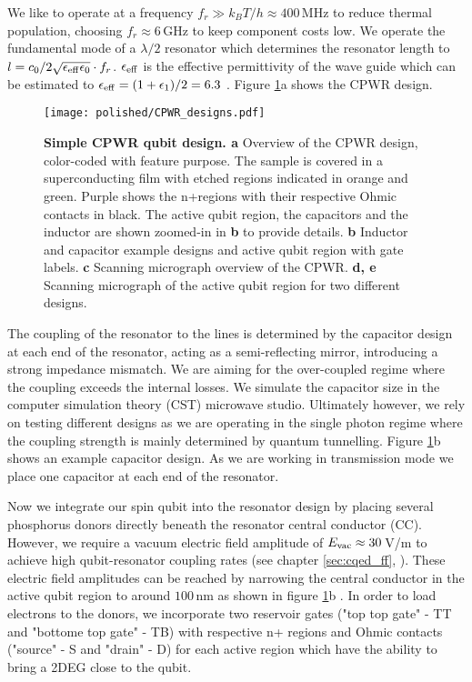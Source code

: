 We like to operate at a frequency $f_r\gg k_B T/h\approx 400\,$MHz to reduce thermal population, choosing $f_r\approx 6\,$GHz to keep component costs low.  We operate the fundamental mode of a $\lambda/2$ resonator which determines the resonator length to $l=c_0/2\sqrt{\epsilon_{\rm eff}\epsilon_0}\cdot f_r$. $\epsilon_{\rm eff}$ is the effective permittivity of the wave guide which can be estimated to $\epsilon_{\rm eff}=(1+\epsilon_1)/2=6.3$ \cite{PalaciosLaloy2010}. Figure \ref{fig:designCPWR}a shows the CPWR design. 

\begin{figure}
	\centering
	\texttt{[image: polished/CPWR\_designs.pdf]}
	\caption[Simple CPWR qubit design]{\textbf{Simple CPWR qubit design. a} Overview of the CPWR design, color-coded with feature purpose. The sample is covered in a superconducting film with etched regions indicated in orange and green. Purple shows the n+regions with their respective Ohmic contacts in black. The active qubit region, the capacitors and the inductor are shown zoomed-in in \textbf{b} to provide details. \textbf{b} Inductor and capacitor example designs and active qubit region with gate labels. \textbf{c} Scanning micrograph overview of the CPWR. \textbf{d, e} Scanning micrograph of the active qubit region for two different designs. }
	\label{fig:designCPWR}
\end{figure}

The coupling of the resonator to the lines is determined by the capacitor design at each end of the resonator, acting as a semi-reflecting mirror, introducing a strong impedance mismatch. We are aiming for the over-coupled regime where the coupling exceeds the internal losses. We simulate the capacitor size in the computer simulation theory (CST) microwave studio. Ultimately however, we rely on testing different designs as we are operating in the single photon regime where the coupling strength is mainly determined by quantum tunnelling. Figure \ref{fig:designCPWR}b shows an example capacitor design. As we are working in transmission mode we place one capacitor at each end of the resonator. 

Now we integrate our spin qubit into the resonator design by placing several phosphorus donors directly beneath the resonator central conductor (CC). However, we require a vacuum electric field amplitude of $E_{\rm vac}\approx 30\,$V/m to achieve high qubit-resonator coupling rates (see chapter \ref{sec:cqed_ff}, \cite{Tosi2017}). These electric field amplitudes can be reached by narrowing the central conductor in the active qubit region to around $100\,$nm as shown in figure \ref{fig:designCPWR}b \cite{Samkharadze2016}. In order to load electrons to the donors, we incorporate two reservoir gates ("top top gate" - TT and "bottome top gate" - TB) with respective n+ regions and Ohmic contacts ("source" - S and "drain" - D) for each active region which have the ability to bring a 2DEG close to the qubit.


